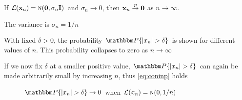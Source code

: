 \begin{frame}
    
    \vspace{2em}
    \Eg
        If $\mathcal L({\mathbf x}_n) =  \textrm{\sc n}({\mathbf 0},\sigma_n\mathbf I)$ and $\sigma_n \to 0$,
        then ${\mathbf x}_n \stackrel { p } {\to} {\mathbf 0}$ as $n\to \infty$.
        
        The variance is $\sigma_n = 1/n$
        
        With fixed $\delta > 0$, the probability $\PP \{ |x_n | > \delta \}$ is
        shown for different values of $n$. This probability collapses to zero
        as $n \to \infty$
        
        If we now fix $\delta$ at a smaller positive value, 
        $\PP \{ |x_n | > \delta \}$ can again be made arbitrarily small by
        increasing $n$, thus \eqref{eq:coninp} holds
        
\end{frame}

\begin{frame}

    \vspace{2em}
    \begin{figure}
    \centering
    \caption{\label{f:conv_prob}  $\PP \{ |x_n | > \delta \} \to 0$ when
    $\mathcal L(x_n) = \textrm{\sc n}(0, 1/n)$}
    \end{figure}
    
\end{frame}

